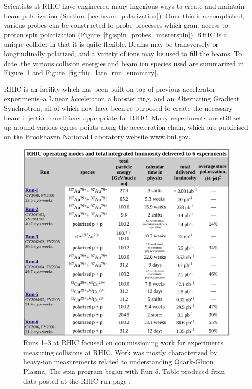 Scientists at RHIC have engineered many ingenious ways to create and maintain
beam polarization (Section~\ref{sec:beam_polarization}). Once this is
accomplished, various probes can be constructed to probe processes which grant
access to proton spin polarization (Figure~\ref{fig:spin_probes_masterspin}).
RHIC is a unique collider in that it is quite flexible. Beams may be
transversely or longitudinally polarized, and a variety of ions may be used to
fill the beams. To date, the various collision energies and beam ion species
used are summarized in Figure~\ref{fig:rhic_early_run_summary} and
Figure~\ref{fig:rhic_late_run_summary}.

RHIC is an facility which has been built on top of previous accelerator
experiments--a Linear Accelerator, a booster ring, and an Alternating Gradient
Synchrotron, all of which now have been re-purposed to create the necessary beam
injection conditions appropriate for RHIC. Many experiments are still set up
around various egress points along the acceleration chain, which are publicised
on the Brookhaven National Laboratory website \url{www.bnl.gov}.

\begin{figure}[ht]
  \centering
  \includegraphics[width=0.8\linewidth]{./figures/rhic_early_run_summary.png}
  \caption{ 
    Runs 1--3 at RHIC focused on commissioning work for experiments measuring
    collisions at RHIC. Work was mostly characterized by heavy-ion measurements
    related to understanding Quark-Gluon Plasma. The spin program began with Run
    5. Table produced from data posted at the RHIC run page \cite{Fischer2016}.
  }
  \label{fig:rhic_early_run_summary}
\end{figure}

